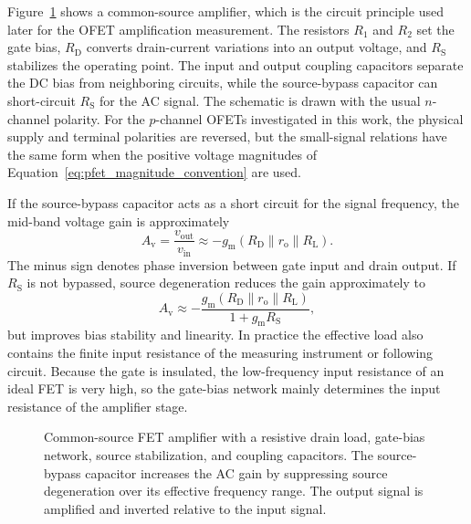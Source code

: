 Figure~\ref{fig:fet_common_source_amplifier} shows a common-source amplifier,
which is the circuit principle used later for the OFET amplification
measurement. The resistors $R_1$ and $R_2$ set the gate bias, $R_\mathrm{D}$
converts drain-current variations into an output voltage, and $R_\mathrm{S}$
stabilizes the operating point. The input and output coupling capacitors separate
the DC bias from neighboring circuits, while the source-bypass capacitor can
short-circuit $R_\mathrm{S}$ for the AC signal. The schematic is drawn with the
usual $n$-channel polarity. For the $p$-channel OFETs investigated in this work,
the physical supply and terminal polarities are reversed, but the small-signal
relations have the same form when the positive voltage magnitudes of
Equation~\ref{eq:pfet_magnitude_convention} are used.

If the source-bypass capacitor acts as a short circuit for the signal frequency,
the mid-band voltage gain is approximately
\begin{equation}
    A_\mathrm{v}
    = \frac{v_\mathrm{out}}{v_\mathrm{in}}
    \approx -g_\mathrm{m}
    \left(R_\mathrm{D}\parallel r_\mathrm{o}\parallel R_\mathrm{L}\right).
    \label{eq:fet_common_source_gain}
\end{equation}
The minus sign denotes phase inversion between gate input and drain output. If
$R_\mathrm{S}$ is not bypassed, source degeneration reduces the gain approximately
to
\begin{equation}
    A_\mathrm{v}
    \approx
    -\frac{g_\mathrm{m}
    \left(R_\mathrm{D}\parallel r_\mathrm{o}\parallel R_\mathrm{L}\right)}
    {1+g_\mathrm{m}R_\mathrm{S}},
    \label{eq:fet_source_degenerated_gain}
\end{equation}
but improves bias stability and linearity. In practice the effective load also
contains the finite input resistance of the measuring instrument or following
circuit. Because the gate is insulated, the low-frequency input resistance of an
ideal FET is very high, so the gate-bias network mainly determines the input
resistance of the amplifier stage.

\begin{figure}[htbp]
    \centering
    \resizebox{0.62\textwidth}{!}{}
    \caption[Common-source FET amplifier]{Common-source FET amplifier with a
    resistive drain load, gate-bias network, source stabilization, and coupling
    capacitors. The source-bypass capacitor increases the AC gain by suppressing
    source degeneration over its effective frequency range. The output signal is
    amplified and inverted relative to the input signal.}
    \label{fig:fet_common_source_amplifier}
\end{figure}

